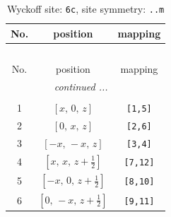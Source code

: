 \documentclass[fleqn,8pt]{jsarticle}
\begin{document}
\renewcommand{\arraystretch}{1.2}
\begin{longtable}{ccc}
\caption{Wyckoff site: {\tt 6c}, site symmetry: {\tt ..m}}
 \\
 \hline \hline
No. & position & mapping \\ \hline \endfirsthead

\multicolumn{2}{l}{\tablename\ \thetable{}} \\
 \hline \hline
No. & position & mapping \\ \hline \endhead

 \hline \hline
\multicolumn{2}{r}{\footnotesize\it continued ...} \\ \endfoot

 \hline \hline
\multicolumn{2}{r}{} \\ \endlastfoot

1 & $\left[ x,\, 0,\, z \right]$ & {\tt [1,5]} \\ \hline
2 & $\left[ 0,\, x,\, z \right]$ & {\tt [2,6]} \\ \hline
3 & $\left[ - x,\, - x,\, z \right]$ & {\tt [3,4]} \\ \hline
4 & $\left[ x,\, x,\, z + \frac{1}{2} \right]$ & {\tt [7,12]} \\ \hline
5 & $\left[ - x,\, 0,\, z + \frac{1}{2} \right]$ & {\tt [8,10]} \\ \hline
6 & $\left[ 0,\, - x,\, z + \frac{1}{2} \right]$ & {\tt [9,11]} \\
\end{longtable}
\renewcommand{\arraystretch}{1.2}
\end{document}
